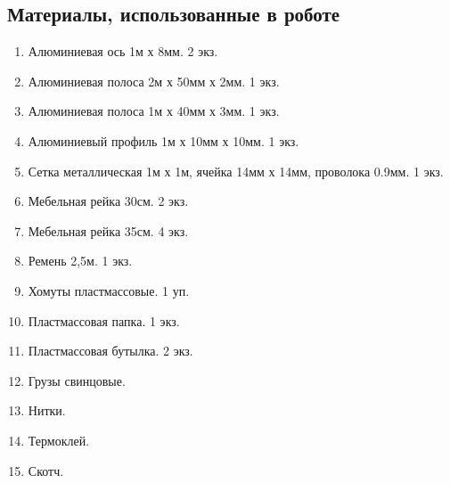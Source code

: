 
\subsection{Материалы, использованные в роботе}

\begin{enumerate}
	\item Алюминиевая ось 1м х 8мм. 2 экз.
	\item Алюминиевая полоса 2м х 50мм х 2мм. 1 экз.
	\item Алюминиевая полоса 1м х 40мм х 3мм. 1 экз.
	\item Алюминиевый профиль 1м х 10мм х 10мм. 1 экз.
	\item Сетка металлическая 1м х 1м, ячейка 14мм х 14мм, проволока 0.9мм. 1 экз.
	\item Мебельная рейка 30см. 2 экз.
	\item Мебельная рейка 35см. 4 экз.
	\item Ремень 2,5м. 1 экз.
	\item Хомуты пластмассовые. 1 уп.
	\item Пластмассовая папка. 1 экз.
	\item Пластмассовая бутылка. 2 экз.
	\item Грузы свинцовые.
	\item Нитки.
	\item Термоклей.
	\item Скотч.
\end{enumerate}
\fillpage
\newpage


